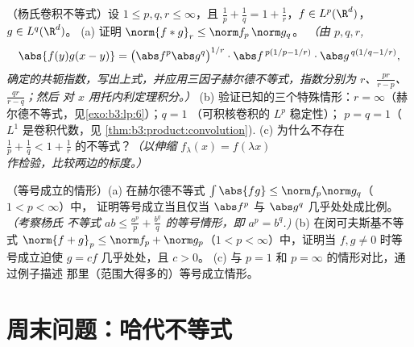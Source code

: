 \begin{exercise}[$\star\star\star$]\label{exo:b3:lp:11}
（杨氏卷积不等式）设 $1 \leq p, q, r \leq
\infty$，且 $\frac1p + \frac1q = 1 + \frac1r$，$f \in
L^p(\R^d)$，$g \in L^q(\R^d)$。
(a) 证明 $\norm{f * g}_r \leq \norm f_p\,\norm g_q$。
\emph{（由 $p, q,
r$,
\[
\abs{f(y)g(x-y)} = \bigl(\abs f^p\abs g^q\bigr)^{1/r}
\cdot\abs f^{\,p(1/p - 1/r)}\cdot\abs g^{\,q(1/q - 1/r)},
\]
确定的共轭指数，写出上式，并应用三因子赫尔德不等式，指数分别为
$r$、$\frac{pr}{r - p}$、$\frac{qr}{r - q}$；然后
对 $x$ 用托内利定理积分。）}
(b) 验证已知的三个特殊情形：$r =
\infty$（赫尔德不等式，见\cref{exo:b3:lp:6}）；$q = 1$
（可积核卷积的 $L^p$ 稳定性）；
$p = q = 1$（$L^1$ 是卷积代数，见
\cref{thm:b3:product:convolution}).
(c) 为什么不存在 $\frac1p + \frac1q < 1 +
\frac1r$ 的不等式？\emph{（以伸缩 $f_\lambda(x) =
f(\lambda x)$ 作检验，比较两边的标度。）}
\end{exercise}

\begin{exercise}[$\star\star$]\label{exo:b3:lp:12}
（等号成立的情形）(a) 在赫尔德不等式
$\int\abs{fg} \leq \norm f_p\norm g_q$（$1 < p < \infty$）中，
证明等号成立当且仅当 $\abs f^p$ 与 $\abs g^q$
几乎处处成比例。\emph{（考察杨氏
不等式 $ab \leq \frac{a^p}p + \frac{b^q}q$ 的等号情形，即 $a^p
= b^q$.)}
(b) 在闵可夫斯基不等式 $\norm{f + g}_p \leq \norm f_p
+ \norm g_p$（$1 < p < \infty$）中，证明当 $f,
g \neq 0$ 时等号成立迫使 $g = cf$ 几乎处处，且 $c > 0$。
(c) 与 $p = 1$ 和 $p = \infty$ 的情形对比，通过例子描述
那里（范围大得多的）等号成立情形。
\end{exercise}

\section{周末问题：哈代不等式}

